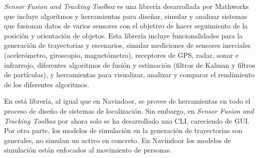 \emph{Sensor Fusion and Tracking Toolbox} \cite{Mathworks} es una librería desarrollada por Mathworks que incluye algoritmos y herramientas para diseñar, simular y analizar sistemas que fusionan datos de varios sensores con el objetivo de hacer seguimiento de la posición y orientación de objetos.
Esta librería incluye funcionalidades para la generación de trayectorias y escenarios, simular mediciones de sensores inerciales (acelerómetro, giroscopio, magnetómetro), receptores de GPS, radar, sonar e infrarrojo, diferentes algoritmos de fusión y estimación (filtros de Kalman y filtros de partículas), y herramientas para visualizar, analizar y comparar el rendimiento de los diferentes algoritmos.

En está librería, al igual que en Navindoor, se provee de herramientas en todo el proceso de diseño de sistemas de localización. Sin embargo, en \emph{Sensor Fusion and Tracking Toolbox} por ahora solo se ha desarrollado una  CLI, careciendo de GUI. Por otra parte, los modelos de simulación en la generación de trayectorias son generales, no simulan un activo en concreto. En Navindoor los modelos de simulación están enfocados al movimiento de personas.